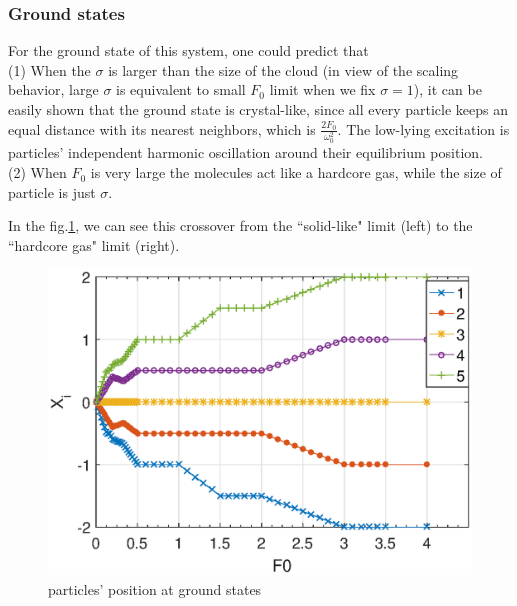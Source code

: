 \documentclass[aps,pre,twocolumn,groupedaddress]{revtex4-1}
\begin{document}
\subsubsection{Ground states}
For the ground state of this system, one could predict that \\(1) When the $\sigma$ is larger than the size of the cloud (in view of the scaling behavior, large $\sigma$ is equivalent to small $F_0$ limit when we fix $\sigma=1$), it can be easily shown that the ground state is crystal-like, since all every particle keeps an equal distance with its nearest neighbors, which is $\frac{2F_0}{\omega_0^2}$. The low-lying excitation is particles' independent harmonic oscillation around their equilibrium position.\\(2) When $F_0$ is very large the molecules act like a hardcore gas, while the size of particle is just $\sigma$.

In the fig.\ref{fig:GS1}, we can see this crossover from the ``solid-like" limit (left) to the ``hardcore gas" limit (right).

\begin{figure}[hbtp]
\centering
\includegraphics[scale=0.6]{ZhiyuPictures/N=5_GS_pre_2_rev.eps}
\caption{particles' position at ground states }
\label{fig:GS1}
\end{figure}


\end{document}
